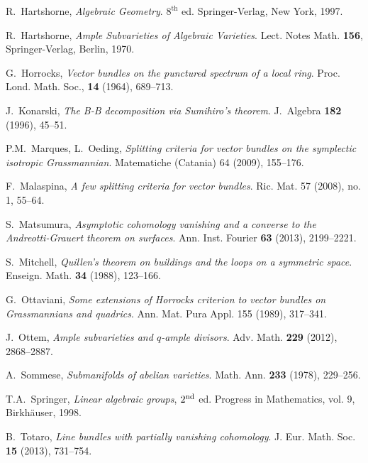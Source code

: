 \documentclass[11pt,reqno]{amsart}
\numberwithin{equation}{section}
\numberwithin{figure}{section}
\begin{document}
\begin{thebibliography}{ooo}
 \textrm{R.~Hartshorne}, 
\textit{Algebraic Geometry}. $8^{\textrm{th}}$ ed. 
Springer-Verlag, New York, 1997. 

 \textrm{R.~Hartshorne}, 
\textit{Ample Subvarieties of Algebraic Varieties}. 
Lect. Notes Math. \textbf{156}, Springer-Verlag, Berlin, 1970.

 \textrm{G.~Horrocks},
\textit{Vector bundles on the punctured spectrum of a local ring}. 
Proc. Lond. Math. Soc., \textbf{14} (1964), 689--713.

 J.~Konarski, 
\textit{The B-B decomposition via Sumihiro's theorem}. 
J.~Algebra \textbf{182} (1996), 45--51.

 \textrm{P.M.~Marques,  L.~Oeding}, 
\textit{Splitting criteria for vector bundles on the symplectic isotropic Grassmannian}. 
Matematiche (Catania) 64 (2009), 155--176. 

 \textrm{F.~Malaspina}, 
\textit{A few splitting criteria for vector bundles}. 
Ric. Mat. 57 (2008), no. 1, 55--64.

 \textrm{S.~Matsumura},
\textit{Asymptotic cohomology vanishing and a converse 
to the Andreotti-Grauert theorem on surfaces}. 
Ann. Inst. Fourier \textbf{63} (2013), 2199--2221.

 \textrm{S.~Mitchell}, 
\textit{Quillen's theorem on buildings and the loops on a symmetric space}.
Enseign. Math. \textbf{34} (1988), 123--166.

 \textrm{G.~Ottaviani}, 
\textit{Some extensions of Horrocks criterion to vector bundles 
on Grassmannians and quadrics}. Ann. Mat. Pura Appl. 155 (1989), 317--341. 

 \textrm{J.~Ottem}, 
\textit{Ample subvarieties and $q$-ample divisors}. 
Adv. Math. \textbf{229} (2012), 2868--2887.

 \textrm{A.~Sommese}, 
\textit{Submanifolds of abelian varieties}. 
Math. Ann. \textbf{233} (1978), 229--256.

 \textrm{T.A.~Springer}, 
\textit{Linear algebraic groups}, $2^{\rm nd}$ ed. 
Progress in Mathematics, vol. 9, Birkh\"auser, 1998. 

 \textrm{B.~Totaro}, 
\textit{Line bundles with partially vanishing cohomology}. 
J. Eur. Math. Soc. \textbf{15} (2013), 731--754.

\end{thebibliography}
\end{document}
